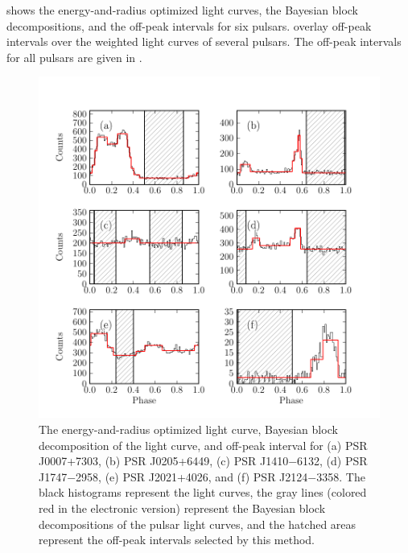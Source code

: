  shows the energy-and-radius optimized light
curves, the Bayesian block decompositions, and the off-peak intervals for
six pulsars.  \citep{abdo_2013a_second-fermi} overlay off-peak intervals
over the weighted light curves of several pulsars.  The off-peak intervals
for all pulsars are given in \citep{abdo_2013a_second-fermi}.

\begin{figure}
  \includegraphics{chapters/offpeak/figures/off_peak_phase_color.pdf}
  \caption{The energy-and-radius optimized light curve, Bayesian
  block decomposition of the light curve, and off-peak interval for
  (a) PSR J0007+7303, (b) PSR J0205+6449, (c) PSR J1410$-$6132, (d) PSR
  J1747$-$2958, (e) PSR J2021+4026, and (f) PSR J2124$-$3358.  The black
  histograms represent the light curves, the gray lines (colored red in
  the electronic version) represent the Bayesian block decompositions of
  the pulsar light curves, and the hatched areas represent the off-peak
  intervals selected by this method.}
\end{figure}

